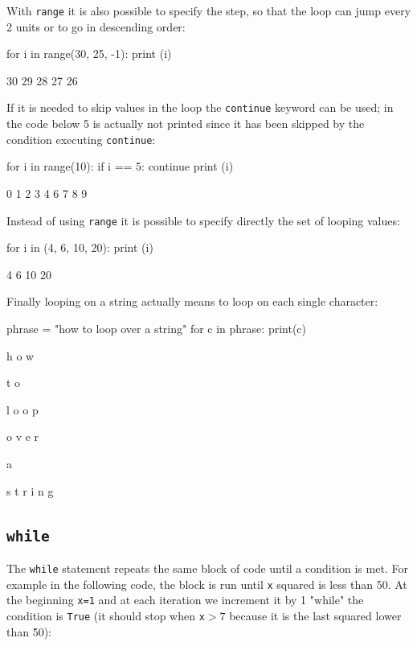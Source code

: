 With \texttt{range} it is also possible to specify the step, so that the loop can jump every 2 units or to go in descending order:

\begin{ipython}
for i in range(30, 25, -1):
    print (i)	
\end{ipython}
\begin{ioutput}
30
29
28
27
26	
\end{ioutput}

If it is needed to skip values in the loop the \texttt{continue} keyword can be used; 
in the code below 5 is actually not printed since it has been skipped by the condition executing 
\texttt{continue}:

\begin{ipython}
for i in range(10):
    if i == 5:
        continue
    print (i)	
\end{ipython}
\begin{ioutput}
0
1
2
3
4
6
7
8
9	
\end{ioutput}

Instead of using \texttt{range} it is possible to specify directly the set of looping values:

\begin{ipython}
for i in (4, 6, 10, 20):
    print (i)	
\end{ipython}
\begin{ioutput}
4
6
10
20	
\end{ioutput}

Finally looping on a string actually means to loop on each single character:
 
\begin{ipython}
phrase = "how to loop over a string"
for c in phrase:
    print(c) 	
\end{ipython}
\begin{ioutput}
h
o
w

t
o

l
o
o
p

o
v
e
r

a

s
t
r
i
n
g
\end{ioutput}
 
\subsection{\texttt{while}}\label{while}

The \texttt{while} statement repeats the same block of code until a condition is met.
For example in the following code, the block is run until \texttt{x} squared is less than 50.
At the beginning \texttt{x=1} and at each iteration we increment it by 1 "while" the condition 
is \texttt{True} (it should stop when \texttt{x}$\gt 7$ because it is the last squared lower than 50):


